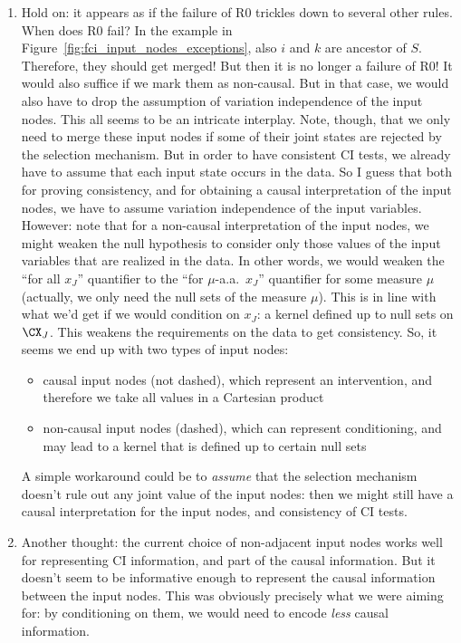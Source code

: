 {\begin{enumerate}
  \item Hold on: it appears as if the failure of R0 trickles down to several other rules.
    When does R0 fail? In the example in Figure~\ref{fig:fci_input_nodes_exceptions}, also $i$ and $k$
    are ancestor of $S$. Therefore, they should get merged! But then it is no longer a failure of R0!
    It would also suffice if we mark them as non-causal. But in that case, we would also have to 
    drop the assumption of variation independence of the input nodes.
    This all seems to be an intricate interplay.
    Note, though, that we only need to merge these input nodes if some of their joint states are
    rejected by the selection mechanism. But in order to have consistent CI tests, we already have
    to assume that each input state occurs in the data.
    So I guess that both for proving consistency, and for obtaining a causal interpretation of the
    input nodes, we have to assume variation independence of the input variables.
    However: note that for a non-causal interpretation of the input nodes, we might weaken the
    null hypothesis to consider only those values of the input variables that are realized in the data.
    In other words, we would weaken the ``for all $x_J$'' quantifier to the ``for $\mu$-a.a.\ $x_J$''
    quantifier for some measure $\mu$ (actually, we only need the null sets of the measure $\mu$).
    This is in line with what we'd get if we would condition on $x_J$: a kernel defined up to null sets on $\CX_J$.
    This weakens the requirements on the data to get consistency.
    So, it seems we end up with two types of input nodes:
    \begin{itemize}
      \item causal input nodes (not dashed), which represent an intervention, and therefore we 
        take all values in a Cartesian product
      \item non-causal input nodes (dashed), which can represent conditioning, and may lead to
        a kernel that is defined up to certain null sets
    \end{itemize}
    A simple workaround could be to \emph{assume} that the selection mechanism doesn't rule out
    any joint value of the input nodes: then we might still have a causal interpretation for the
    input nodes, and consistency of CI tests.

  \item Another thought: the current choice of non-adjacent input nodes works well for representing
    CI information, and part of the causal information. But it doesn't seem to be informative enough
    to represent the causal information between the input nodes. This was obviously precisely what
    we were aiming for: by conditioning on them, we would need to encode \emph{less} causal information.


\end{enumerate}}
